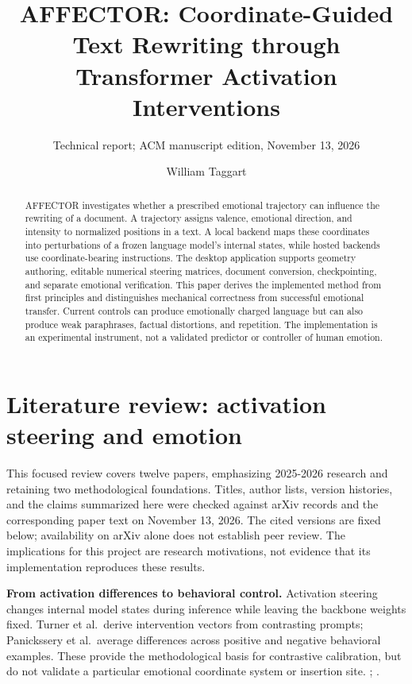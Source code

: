 \documentclass[manuscript,screen,nonacm]{acmart}
\begin{document}
\title{AFFECTOR: Coordinate-Guided Text Rewriting through Transformer
Activation Interventions}
\author{William Taggart}
\subtitle{Technical report; ACM manuscript edition, November 13, 2026}
\begin{abstract}
AFFECTOR investigates whether a prescribed emotional trajectory can
influence the rewriting of a document. A trajectory assigns valence,
emotional direction, and intensity to normalized positions in a text. A
local backend maps these coordinates into perturbations of a frozen
language model's internal states, while hosted backends use
coordinate-bearing instructions. The desktop application supports
geometry authoring, editable numerical steering matrices, document
conversion, checkpointing, and separate emotional verification. This
paper derives the implemented method from first principles and
distinguishes mechanical correctness from successful emotional transfer.
Current controls can produce emotionally charged language but can also
produce weak paraphrases, factual distortions, and repetition. The
implementation is an experimental instrument, not a validated predictor
or controller of human emotion.
\end{abstract}
\maketitle
\section{Literature review: activation steering and
emotion}\label{literature-review-activation-steering-and-emotion}

This focused review covers twelve papers, emphasizing 2025-2026 research
and retaining two methodological foundations. Titles, author lists,
version histories, and the claims summarized here were checked against
arXiv records and the corresponding paper text on November 13, 2026. The
cited versions are fixed below; availability on arXiv alone does not
establish peer review. The implications for this project are research
motivations, not evidence that its implementation reproduces these
results.

\textbf{From activation differences to behavioral control.} Activation
steering changes internal model states during inference while leaving
the backbone weights fixed. Turner et al.~derive intervention vectors
from contrasting prompts; Panickssery et al.~average differences across
positive and negative behavioral examples. These provide the
methodological basis for contrastive calibration, but do not validate a
particular emotional coordinate system or insertion site.
\citep{turner2023actadd}; \citep{panickssery2024caa}.
\end{document}
